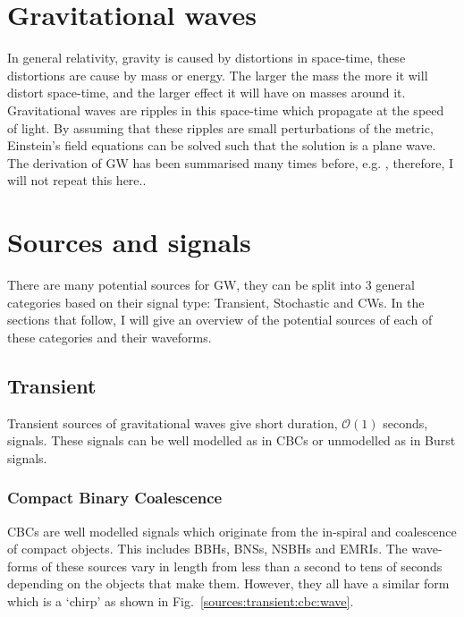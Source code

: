 \section{Gravitational waves}

In general relativity, gravity is caused by distortions in space-time, these distortions are cause by mass or energy. 
The larger the mass the more it will distort space-time, and the larger effect it will have on masses around it.
Gravitational waves are ripples in this space-time which propagate at the speed of light. 
By assuming that these ripples are small perturbations of the metric, Einstein's field equations can be solved such that the solution is a plane wave. 
The derivation of \ac{GW} has been summarised many times before, e.g. \cite{}, therefore, I will not repeat this here.. 


\section{\label{sources}Sources and signals}

There are many potential sources for \ac{GW}, they can be split into 3 general categories based on their signal type: Transient, Stochastic and \acp{CW}. 
In the sections that follow, I will give an overview of the potential sources of each of these categories and their waveforms.


\subsection{\label{sources:transient} Transient}

Transient sources of gravitational waves give short duration, $\mathcal{O}(1)$ seconds, signals.
These signals can be well modelled as in \acp{CBC} or unmodelled as in Burst signals.

\subsubsection{\label{sources:transient:cbc} Compact Binary Coalescence}

\acp{CBC} are well modelled signals which originate from the in-spiral and coalescence of compact objects. 
This includes \acp{BBH}, \acp{BNS}, \acp{NSBH} and \acp{EMRI}. 
The wave-forms of these sources vary in length from less than a second to tens of seconds depending on the objects that make them.
However, they all have a similar form which is a `chirp' as shown in Fig.~\ref{sources:transient:cbc:wave}.

